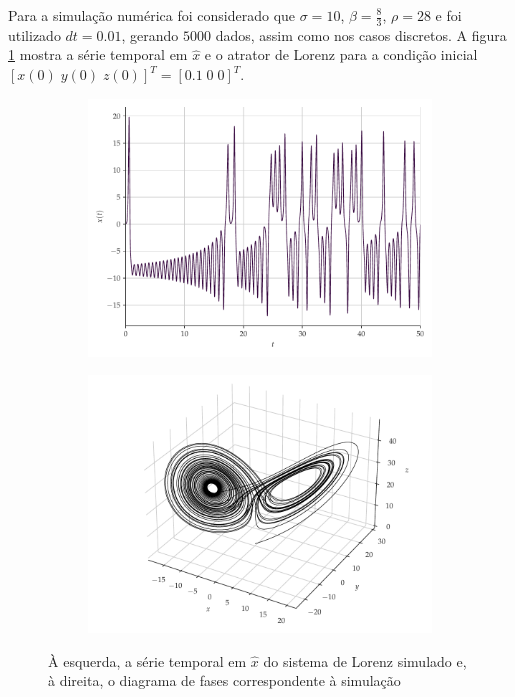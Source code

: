 \documentclass{article}
\begin{document}
Para a simulação numérica foi considerado que $\sigma = 10$, $\beta = \frac{8}{3}$, $\rho = 28$ e foi utilizado $dt = 0.01$, gerando $5000$ dados, assim como nos casos discretos. A figura \ref{fig:lorenz} mostra a série temporal em $\hat{x}$ e o atrator de Lorenz para a condição inicial $[x(0)\; y(0)\; z(0)]^T = [0.1\; 0\; 0]^T$.
\begin{figure}[H]
     \begin{subfigure}[t]{0.2\textwidth} 
         \includegraphics[scale=0.2]{serie-lorenz-x.pdf}
     \end{subfigure}
     \centering
     \begin{subfigure}[t]{0.2\textwidth}
         \includegraphics[scale=0.2]{diagrama-de-fases-lorenz.pdf}
     \end{subfigure}
     \caption{À esquerda, a série temporal em $\hat{x}$ do sistema de Lorenz simulado e, à direita, o diagrama de fases correspondente à simulação}
     \label{fig:lorenz}
\end{figure}
\end{document}
